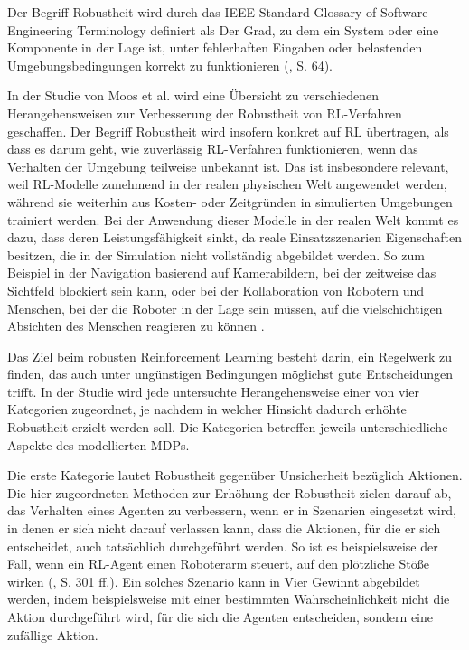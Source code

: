 \label{robustheit}

Der Begriff Robustheit wird durch das IEEE Standard Glossary of Software Engineering Terminology definiert als \glqq Der Grad, zu dem ein System oder eine Komponente in der Lage ist, unter fehlerhaften Eingaben oder belastenden Umgebungsbedingungen korrekt zu funktionieren\grqq{} (\cite{IEEE.1990}, S. 64).

In der Studie von Moos et al. wird eine Übersicht zu verschiedenen Herangehensweisen zur Verbesserung der Robustheit von RL-Verfahren geschaffen. Der Begriff Robustheit wird insofern konkret auf RL übertragen, als dass es darum geht, wie zuverlässig RL-Verfahren funktionieren, wenn das Verhalten der Umgebung teilweise unbekannt ist. Das ist insbesondere relevant, weil RL-Modelle zunehmend in der realen physischen Welt angewendet werden, während sie weiterhin aus Kosten- oder Zeitgründen in simulierten Umgebungen trainiert werden. Bei der Anwendung dieser Modelle in der realen Welt kommt es dazu, dass deren Leistungsfähigkeit sinkt, da reale Einsatzszenarien Eigenschaften besitzen, die in der Simulation nicht vollständig abgebildet werden. So zum Beispiel in der Navigation basierend auf Kamerabildern, bei der zeitweise das Sichtfeld blockiert sein kann, oder bei der Kollaboration von Robotern und Menschen, bei der die Roboter in der Lage sein müssen, auf die vielschichtigen Absichten des Menschen reagieren zu können \cite{Moos.2022}\cite{Ni.2021}.

Das Ziel beim robusten Reinforcement Learning besteht darin, ein Regelwerk zu finden, das auch unter ungünstigen Bedingungen möglichst gute Entscheidungen trifft. In der Studie wird jede untersuchte Herangehensweise einer von vier Kategorien zugeordnet, je nachdem in welcher Hinsicht dadurch erhöhte Robustheit erzielt werden soll. Die Kategorien betreffen jeweils unterschiedliche Aspekte des modellierten MDPs.

Die erste Kategorie lautet Robustheit gegenüber Unsicherheit bezüglich Aktionen. Die hier zugeordneten Methoden zur Erhöhung der Robustheit zielen darauf ab, das Verhalten eines Agenten zu verbessern, wenn er in Szenarien eingesetzt wird, in denen er sich nicht darauf verlassen kann, dass die Aktionen, für die er sich entscheidet, auch tatsächlich durchgeführt werden. So ist es beispielsweise der Fall, wenn ein RL-Agent einen Roboterarm steuert, auf den plötzliche Stöße wirken (\cite{Moos.2022}, S. 301 ff.). Ein solches Szenario kann in Vier Gewinnt abgebildet werden, indem beispielsweise mit einer bestimmten Wahrscheinlichkeit nicht die Aktion durchgeführt wird, für die sich die Agenten entscheiden, sondern eine zufällige Aktion.

